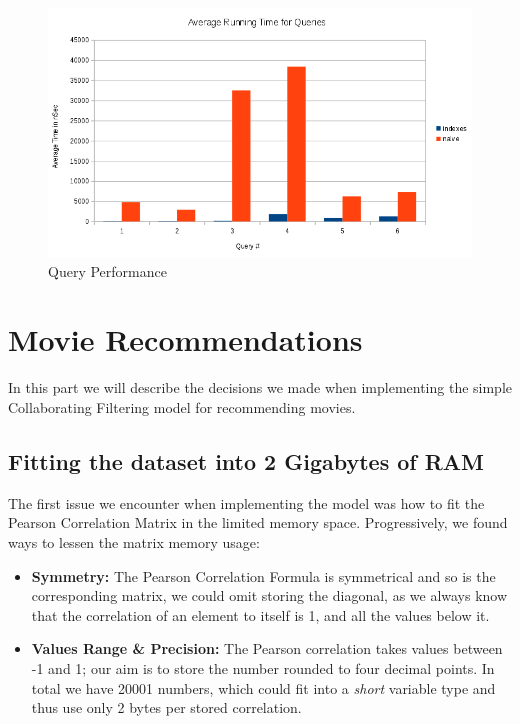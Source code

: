 \documentclass[12pt]{article}
\begin{document}
\begin{figure}[h]
    \centering
    \includegraphics[width=1\textwidth]{queries}
    \caption{Query Performance}
    \label{fig:queries}
\end{figure}
 


\section{Movie Recommendations}

In this part we will describe the decisions we made when implementing the simple Collaborating Filtering model for recommending movies.

\subsection{Fitting the dataset into 2 Gigabytes of RAM}

The first issue we encounter when implementing the model was how to fit the Pearson Correlation Matrix in the limited memory space. Progressively, we found ways to lessen the matrix memory usage:

\begin{itemize}

  \item \textbf{Symmetry:} The Pearson Correlation Formula is symmetrical and so is the corresponding matrix, we could omit storing the diagonal, as we always know that the correlation of an element to itself is 1, and all the values below it.
  \item \textbf{Values Range \& Precision:} The Pearson correlation takes values between -1 and 1; our aim is to store the number rounded to four decimal points. In total we have 20001 numbers, which could fit into a \textit{short} variable type and thus use only 2 bytes per stored correlation.

\end{itemize}
\end{document}
